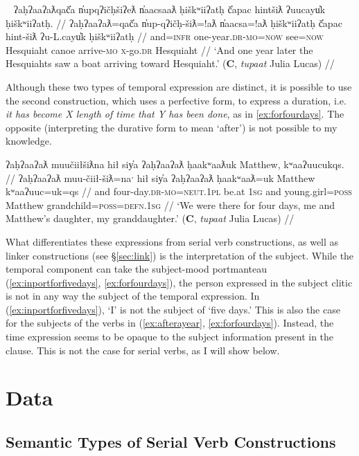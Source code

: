 \ex~ \label{ex:afterayear}
\begingl
\glpreamble ʔaḥʔaaʔaƛqač̓a n̓upqʔičḥšiʔeƛ n̓aacsaaƛ ḥiškʷiiʔatḥ č̓apac hintšiƛ ʔuucayu̓k ḥiškʷiiʔatḥ. //
\gla ʔaḥʔaaʔaƛ=qač̓a n̓up-qʔičḥ-šiƛ=!aƛ n̓aacsa=!aƛ ḥiškʷiiʔatḥ č̓apac hint-šiƛ ʔu-L.cayu̓k ḥiškʷiiʔatḥ //
\glb and=\textsc{infr} one-year.\textsc{dr}-\textsc{mo}=\textsc{now} see=\textsc{now} Hesquiaht canoe arrive-\textsc{mo} \textsc{x}-go.\textsc{dr} Hesquiaht //
\glft `And one year later the Hesquiahts saw a boat arriving toward Hesquiaht.' (\textbf{C}, \textit{tupaat} Julia Lucas) //
\endgl
\xe

Although these two types of temporal expression are distinct, it is possible to use the second construction, which uses a perfective form, to express a duration, i.e. \textit{it has become X length of time that Y has been done}, as in \ref{ex:forfourdays}. The opposite (interpreting the durative form to mean `after') is not possible to my knowledge.

\ex \label{ex:forfourdays}
\begingl
\glpreamble ʔaḥʔaaʔaƛ muučiiłšiƛna hił siy̓a ʔaḥʔaaʔaƛ ḥaakʷaaƛuk Matthew, kʷaaʔuucukqs. //
\gla ʔaḥʔaaʔaƛ muu-čiił-šiƛ=naˑ hił siy̓a ʔaḥʔaaʔaƛ ḥaakʷaaƛ=uk Matthew kʷaaʔuuc=uk=qs //
\glb and four-day.\textsc{dr}-\textsc{mo}=\textsc{neut.1pl} be.at \textsc{1sg} and young.girl=\textsc{poss} Matthew grandchild=\textsc{poss}=\textsc{defn.1sg} //
\glft `We were there for four days, me and Matthew's daughter, my granddaughter.' (\textbf{C}, \textit{tupaat} Julia Lucas) //
\endgl
\xe

What differentiates these expressions from serial verb constructions, as well as linker constructions (see \S\ref{sec:link}) is the interpretation of the subject. While the temporal component can take the subject-mood portmanteau (\ref{ex:inportforfivedays}, \ref{ex:forfourdays}), the person expressed in the subject clitic is not in any way the subject of the temporal expression. In (\ref{ex:inportforfivedays}), `I' is not the subject of `five days.' This is also the case for the subjects of the verbs in (\ref{ex:afterayear}, \ref{ex:forfourdays}). Instead, the time expression seems to be opaque to the subject information present in the clause. This is not the case for serial verbs, as I will show below.

\section{Data} \label{sec:sv:data}

\subsection{Semantic Types of Serial Verb Constructions}

